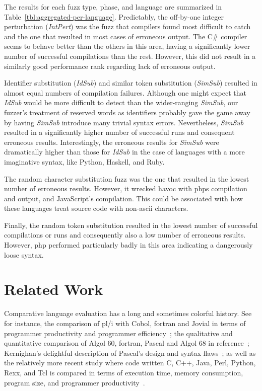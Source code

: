 \documentclass[10pt]{sigplanconf}
\begin{document}
The results for each fuzz type, phase, and language are summarized in
Table~\ref{tbl:aggregated-per-language}.
Predictably, the off-by-one integer perturbation ({\em IntPert})
was the fuzz that
compilers found most difficult to catch and the one that resulted
in most cases of erroneous output.
The C\# compiler seems to behave better than the others in this area,
having a significantly lower number of successful compilations than the
rest.
However, this did not result in a similarly good performance rank
regarding lack of erroneous output.

Identifier substitution ({\em IdSub}) and similar token substitution
({\em SimSub}) resulted in almost equal numbers of compilation failures.
Although one might expect that {\em IdSub} would be more difficult
to detect than the wider-ranging {\em SimSub},
our fuzzer's treatment of reserved words as identifiers
probably gave the game away by having {\em SimSub} introduce many
trivial syntax errors.
Nevertheless, {\em SimSub} resulted in a significantly higher number
of successful runs and consequent erroneous results.
Interestingly,
the erroneous results for {\em SimSub} were dramatically higher
than those for {\em IdSub} in the case of
languages with a more imaginative syntax, like Python, Haskell, and Ruby.

The random character substitution fuzz was the one that resulted
in the lowest number of erroneous results.
However, it wrecked havoc with {\sc php}s compilation and output,
and JavaScript's compilation.
This could be associated with how these languages treat source code
with non-{\sc ascii} characters.

Finally, the random token substitution resulted in the lowest number
of successful compilations or runs and consequently
also a low number of erroneous results.
However,
{\sc php} performed particularly badly in this area indicating a
dangerously loose syntax.

\section{Related Work} %
\label{sec:related}

Comparative language evaluation has a long and sometimes colorful history.
See for instance,
the comparison of {\sc pl/i} with Cobol, {\sc fortran} and Jovial in
terms of programmer productivity and programmer efficiency~\cite{RWSB68};
the qualitative and quantitative comparison of Algol 60,
{\sc fortran}, Pascal and Algol 68 in reference~\cite{BOJO80};
Kernighan's delightful description of
Pascal's design and syntax flaws~\cite{Ker81};
as well as the relatively more recent study where code written
C, C++, Java, Perl, Python, Rexx, and Tcl
is compared in terms of execution time, memory consumption,
program size, and programmer productivity~\cite{PREC00}.
\end{document}

